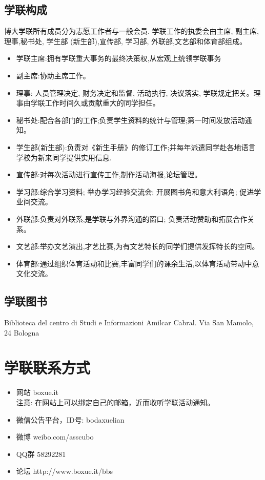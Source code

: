 \documentclass[3pt,a5paper,openright,twoside]{book}
\begin{document}
 

\subsection{学联构成}
博大学联所有成员分为志愿工作者与一般会员. 学联工作的执委会由主席, 副主席,理事,秘书处, 学生部 (新生部),宣传部, 学习部, 外联部,文艺部和体育部组成。
\begin{itemize}
\item 学联主席:拥有学联重大事务的最终决策权,从宏观上统领学联事务
\item 副主席:协助主席工作。 
\item 理事: 人员管理决定, 财务决定和监督, 活动执行, 决议落实, 学联规定把关。理事由学联工作时间久或贡献重大的同学担任。
\item 秘书处:配合各部门的工作;负责学生资料的统计与管理;第一时间发放活动通知。
\item 学生部(新生部):负责对《新生手册》的修订工作;并每年派遣同学赴各地语言学校为新来同学提供实用信息.
\item 宣传部:对每次活动进行宣传工作,制作活动海报,论坛管理。
\item 学习部:综合学习资料; 举办学习经验交流会; 开展图书角和意大利语角; 促进学业间交流。
\item 外联部:负责对外联系,是学联与外界沟通的窗口; 负责活动赞助和拓展合作关系。
\item 文艺部:举办文艺演出,才艺比赛,为有文艺特长的同学们提供发挥特长的空间。
\item 体育部:通过组织体育活动和比赛,丰富同学们的课余生活,以体育活动带动中意文化交流。 
\end{itemize}


\subsection{学联图书}
Biblioteca del centro di Studi e Informazioni Amilcar Cabral. Via San Mamolo, 24 Bologna


\section{学联联系方式}
\begin{itemize}
\item 网站 boxue.it \\
注意: 在网站上可以绑定自己的邮箱，近而收听学联活动通知。
\item 微信公告平台，ID号: bodaxuelian
\item 微博 weibo.com/asscubo
\item QQ群 58292281
\item 论坛 http://www.boxue.it/bbs
\end{itemize}
\end{document}
